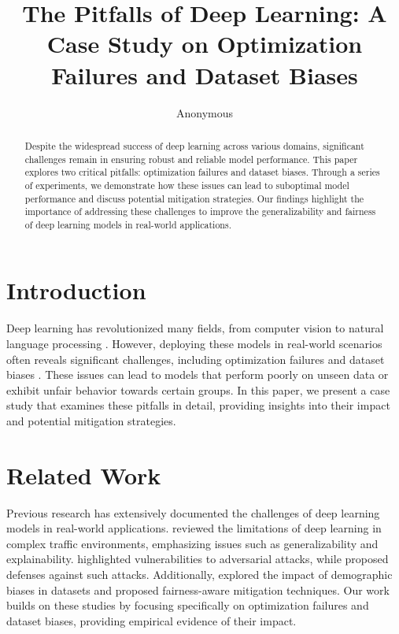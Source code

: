 \documentclass{article} %
\title{
The Pitfalls of Deep Learning: A Case Study on Optimization Failures and Dataset Biases
}
\author{Anonymous}
\theoremstyle{plain}
\theoremstyle{definition}
\theoremstyle{remark}
\begin{document}
\maketitle

\begin{abstract}
Despite the widespread success of deep learning across various domains, significant challenges remain in ensuring robust and reliable model performance. This paper explores two critical pitfalls: optimization failures and dataset biases. Through a series of experiments, we demonstrate how these issues can lead to suboptimal model performance and discuss potential mitigation strategies. Our findings highlight the importance of addressing these challenges to improve the generalizability and fairness of deep learning models in real-world applications.
\end{abstract}

\section{Introduction}
\label{sec:intro}
Deep learning has revolutionized many fields, from computer vision to natural language processing \citep{goodfellow2016deep}. However, deploying these models in real-world scenarios often reveals significant challenges, including optimization failures and dataset biases \citep{borotikar2025accuraciesua}. These issues can lead to models that perform poorly on unseen data or exhibit unfair behavior towards certain groups. In this paper, we present a case study that examines these pitfalls in detail, providing insights into their impact and potential mitigation strategies.

\section{Related Work}
\label{sec:related}
Previous research has extensively documented the challenges of deep learning models in real-world applications. \citet{azfar2022deeplc} reviewed the limitations of deep learning in complex traffic environments, emphasizing issues such as generalizability and explainability. \citet{kuttaten2025adversarialao} highlighted vulnerabilities to adversarial attacks, while \citet{wei2024realworldad} proposed defenses against such attacks. Additionally, \citet{gitonga2025mitigatingdb} explored the impact of demographic biases in datasets and proposed fairness-aware mitigation techniques. Our work builds on these studies by focusing specifically on optimization failures and dataset biases, providing empirical evidence of their impact.
\end{document}
